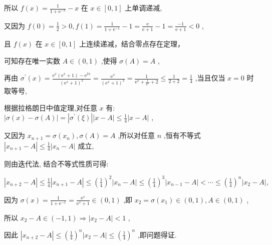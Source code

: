 \documentclass[10pt]{article}
\begin{document}
所以 \(f\left( x\right)  = \frac{1}{1 + {\mathrm{e}}^{-x}} - x\) 在 \(x \in  \left\lbrack  {0,1}\right\rbrack\) 上单调递减,

又因为 \(f\left( 0\right)  = \frac{1}{2} > 0, f\left( 1\right)  = \frac{1}{1 + {\mathrm{e}}^{-1}} - 1 = \frac{\mathrm{e}}{\mathrm{e} + 1} - 1 = \frac{-1}{\mathrm{e} + 1} < 0\) ,

且 \(f\left( x\right)\) 在 \(x \in  \left\lbrack  {0,1}\right\rbrack\) 上连续递减，结合零点存在定理，

可知存在唯一实数 \(A \in  \left( {0,1}\right)\) ,使得 \(\sigma \left( A\right)  = A\) ,

再由 \({\sigma }^{\prime }\left( x\right)  = \frac{{\mathrm{e}}^{x}\left( {{\mathrm{e}}^{x} + 1}\right)  - {\mathrm{e}}^{2x}}{{\left( {\mathrm{e}}^{x} + 1\right) }^{2}} = \frac{{\mathrm{e}}^{x}}{{\left( {\mathrm{e}}^{x} + 1\right) }^{2}} = \frac{1}{{\mathrm{e}}^{x} + \frac{1}{{\mathrm{e}}^{x}} + 2} \leq  \frac{1}{2 + 2} = \frac{1}{4}\) ,当且仅当 \(x = 0\) 时取等号,

根据拉格朗日中值定理,对任意 \(x\) 有: \(\left| {\sigma \left( x\right)  - \sigma \left( A\right) }\right|  = \left| {{\sigma }^{\prime }\left( \xi \right) }\right| \left| {x - A}\right|  \leq  \frac{1}{4}\left| {x - A}\right|\) ,

又因为 \({x}_{n + 1} = \sigma \left( {x}_{n}\right) ,\sigma \left( A\right)  = A\) ,所以对任意 \(n\) ,恒有不等式 \(\left| {{x}_{n + 1} - A}\right|  \leq  \frac{1}{4}\left| {{x}_{n} - A}\right|\) 成立,

则由迭代法, 结合不等式性质可得:

\(\left| {{x}_{n + 2} - A}\right|  \leq  \frac{1}{4}\left| {{x}_{n + 1} - A}\right|  \leq  {\left( \frac{1}{4}\right) }^{2}\left| {{x}_{n} - A}\right|  \leq  {\left( \frac{1}{4}\right) }^{3}\left| {{x}_{n - 1} - A}\right|  < \cdots  \leq  {\left( \frac{1}{4}\right) }^{n}\left| {{x}_{2} - A}\right| ,\)

因为 \(\sigma \left( x\right)  = \frac{1}{1 + {\mathrm{e}}^{-x}} = \frac{{\mathrm{e}}^{x}}{{\mathrm{e}}^{x} + 1} \in  \left( {0,1}\right)\) ,即 \({x}_{2} = \sigma \left( {x}_{1}\right)  \in  \left( {0,1}\right) , A \in  \left( {0,1}\right)\) ,

所以 \({x}_{2} - A \in  \left( {-1,1}\right)  \Rightarrow  \left| {{x}_{2} - A}\right|  < 1\) ,

因此 \(\left| {{x}_{n + 2} - A}\right|  \leq  {\left( \frac{1}{4}\right) }^{n}\left| {{x}_{2} - A}\right|  \leq  {\left( \frac{1}{4}\right) }^{n}\) ,即问题得证.
\end{document}
